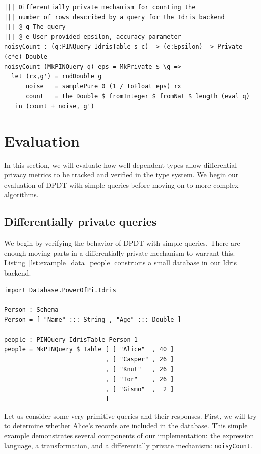 \documentclass[12pt]{article}
\begin{document}
\begin{lstlisting}
||| Differentially private mechanism for counting the
||| number of rows described by a query for the Idris backend
||| @ q The query
||| @ e User provided epsilon, accuracy parameter
noisyCount : (q:PINQuery IdrisTable s c) -> (e:Epsilon) -> Private (c*e) Double
noisyCount (MkPINQuery q) eps = MkPrivate $ \g => 
  let (rx,g') = rndDouble g
      noise   = samplePure 0 (1 / toFloat eps) rx
      count   = the Double $ fromInteger $ fromNat $ length (eval q)
   in (count + noise, g')
\end{lstlisting}

\section{Evaluation}\label{sec:evaluation}

In this section, we will evaluate how well dependent types allow differential privacy metrics to be tracked and verified in the type system.
We begin our evaluation of DPDT with simple queries before moving on to more complex algorithms.

\subsection{Differentially private queries}

We begin by verifying the behavior of DPDT with simple queries.
There are enough moving parts in a differentially private mechanism to warrant this.
Listing~\ref{lst:example_data_people} constructs a small database in our Idris backend.

\begin{lstlisting}[caption={Example Data},label={lst:example_data_people}]
import Database.PowerOfPi.Idris

Person : Schema
Person = [ "Name" ::: String , "Age" ::: Double ]

people : PINQuery IdrisTable Person 1
people = MkPINQuery $ Table [ [ "Alice"  , 40 ]
                            , [ "Casper" , 26 ]
                            , [ "Knut"   , 26 ]
                            , [ "Tor"    , 26 ]
                            , [ "Gismo"  ,  2 ]
                            ]
\end{lstlisting}

Let us consider some very primitive queries and their responses.
First, we will try to determine whether Alice's records are included in the database.
This simple example demonstrates several components of our implementation: the expression language, a transformation, and a differentially private mechanism: \texttt{noisyCount}.
\end{document}
